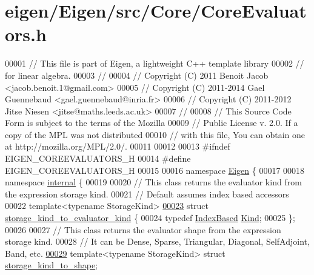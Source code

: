 \hypertarget{eigen_2_eigen_2src_2_core_2_core_evaluators_8h_source}{}\section{eigen/\+Eigen/src/\+Core/\+Core\+Evaluators.h}
\label{eigen_2_eigen_2src_2_core_2_core_evaluators_8h_source}

\begin{DoxyCode}
00001 \textcolor{comment}{// This file is part of Eigen, a lightweight C++ template library}
00002 \textcolor{comment}{// for linear algebra.}
00003 \textcolor{comment}{//}
00004 \textcolor{comment}{// Copyright (C) 2011 Benoit Jacob <jacob.benoit.1@gmail.com>}
00005 \textcolor{comment}{// Copyright (C) 2011-2014 Gael Guennebaud <gael.guennebaud@inria.fr>}
00006 \textcolor{comment}{// Copyright (C) 2011-2012 Jitse Niesen <jitse@maths.leeds.ac.uk>}
00007 \textcolor{comment}{//}
00008 \textcolor{comment}{// This Source Code Form is subject to the terms of the Mozilla}
00009 \textcolor{comment}{// Public License v. 2.0. If a copy of the MPL was not distributed}
00010 \textcolor{comment}{// with this file, You can obtain one at http://mozilla.org/MPL/2.0/.}
00011 
00012 
00013 \textcolor{preprocessor}{#ifndef EIGEN\_COREEVALUATORS\_H}
00014 \textcolor{preprocessor}{#define EIGEN\_COREEVALUATORS\_H}
00015 
00016 \textcolor{keyword}{namespace }\hyperlink{namespace_eigen}{Eigen} \{
00017   
00018 \textcolor{keyword}{namespace }\hyperlink{namespaceinternal}{internal} \{
00019 
00020 \textcolor{comment}{// This class returns the evaluator kind from the expression storage kind.}
00021 \textcolor{comment}{// Default assumes index based accessors}
00022 \textcolor{keyword}{template}<\textcolor{keyword}{typename} StorageKind>
\hyperlink{struct_eigen_1_1internal_1_1storage__kind__to__evaluator__kind}{00023} \textcolor{keyword}{struct }\hyperlink{struct_eigen_1_1internal_1_1storage__kind__to__evaluator__kind}{storage\_kind\_to\_evaluator\_kind} \{
00024   \textcolor{keyword}{typedef} \hyperlink{struct_eigen_1_1internal_1_1_index_based}{IndexBased} \hyperlink{struct_eigen_1_1internal_1_1_index_based}{Kind};
00025 \};
00026 
00027 \textcolor{comment}{// This class returns the evaluator shape from the expression storage kind.}
00028 \textcolor{comment}{// It can be Dense, Sparse, Triangular, Diagonal, SelfAdjoint, Band, etc.}
\hyperlink{struct_eigen_1_1internal_1_1storage__kind__to__shape}{00029} \textcolor{keyword}{template}<\textcolor{keyword}{typename} StorageKind> \textcolor{keyword}{struct }\hyperlink{struct_eigen_1_1internal_1_1storage__kind__to__shape}{storage\_kind\_to\_shape};

\end{DoxyCode}
